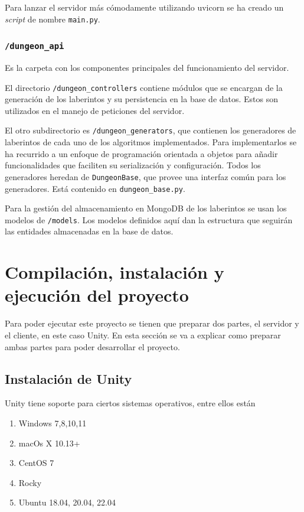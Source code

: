 Para lanzar el servidor más cómodamente utilizando uvicorn se ha creado un \textit{script} de nombre \texttt{main.py}.

\subsubsection{\texttt{/dungeon\_api}}

Es la carpeta con los componentes principales del funcionamiento del servidor.

El directorio \texttt{/dungeon\_controllers} contiene módulos que se encargan de la generación de los laberintos y su persistencia en la base de datos. Estos son utilizados en el manejo de peticiones del servidor.

El otro subdirectorio es \texttt{/dungeon\_generators}, que contienen los generadores de laberintos de cada uno de los algoritmos implementados. Para implementarlos se ha recurrido a un enfoque de programación orientada a objetos para añadir funcionalidades que faciliten su serialización y configuración. Todos los generadores heredan de \texttt{DungeonBase}, que provee una interfaz común para los generadores. Está contenido en \texttt{dungeon\_base.py}.

Para la gestión del almacenamiento en MongoDB de los laberintos se usan los modelos de \texttt{/models}. Los modelos definidos aquí dan la estructura que seguirán las entidades almacenadas en la base de datos.


\section{Compilación, instalación y ejecución del proyecto}
Para poder ejecutar este proyecto se tienen que preparar dos partes, el servidor y el cliente, en este caso Unity. En esta sección se va a explicar como preparar ambas partes para poder desarrollar el proyecto.

\subsection{Instalación de Unity}

Unity tiene soporte para ciertos sistemas operativos, entre ellos están
\begin{enumerate}
    \item Windows 7,8,10,11 
    \item macOs X 10.13+
    \item CentOS 7
    \item Rocky
    \item Ubuntu 18.04, 20.04, 22.04
\end{enumerate}

